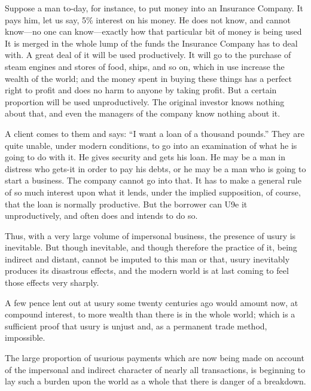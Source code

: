 \documentclass{book}
\begin{document}
Suppose a man to-day, for instance, to put money into an Insurance Company. It pays him, let us say, 5\% interest on his money. He does not know, and cannot know—no one can know—exactly how that particular bit of money is being used It is merged in the whole lump of the funds the Insurance Company has to deal with. A great deal of it will be used productively. It will go to the purchase of steam engines and stores of food, ships, and so on, which in use increase the wealth of the world; and the money spent in buying these things has a perfect right to profit and does no harm to anyone by taking profit. But a certain proportion will be used unproductively. The original investor knows nothing about that, and even the managers of the company know nothing about it.

A client comes to them and says: “I want a loan of a thousand pounds.” They are quite unable, under modern conditions, to go into an examination of what he is going to do with it. He gives security and gets his loan. He may be a man in distress who gets-it in order to pay his debts, or he may be a man who is going to start a business. The company cannot go into that. It has to make a general rule of so much interest upon what it lends, under the implied supposition, of course, that the loan is normally productive. But the borrower can U9e it unproductively, and often does and intends to do so.

Thus, with a very large volume of impersonal business, the presence of usury is inevitable. But though inevitable, and though therefore the practice of it, being indirect and distant, cannot be imputed to this man or that, usury inevitably produces its disastrous effects, and the modern world is at last coming to feel those effects very sharply.

A few pence lent out at usury some twenty centuries ago would amount now, at compound interest, to more wealth than there is in the whole world; which is a sufficient proof that usury is unjust and, as a permanent trade method, impossible.

The large proportion of usurious payments which are now being made on account of the impersonal and indirect character of nearly all transactions, is beginning to lay such a burden upon the world as a whole that there is danger of a breakdown.
\end{document}

